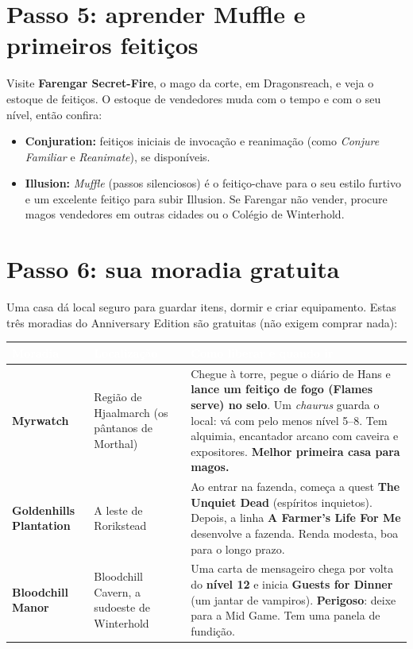 \documentclass[11pt,a4paper,oneside,openany]{book}
\newcommand{\magia}[1]{\textit{\textcolor{SoulCairnPurple}{#1}}}
\newcommand{\quest}[1]{\textsf{\textbf{\textcolor{NecroEmerald}{#1}}}}
\newcommand{\npc}[1]{\textbf{#1}}
\newcommand{\cabec}[1]{\textcolor{white}{\sffamily\bfseries\small #1}}
\newcommand{\tabhead}{\rowcolor{NecroEmerald}}
\begin{document}
\section{Passo 5: aprender Muffle e primeiros feitiços}
Visite \npc{Farengar Secret-Fire}, o mago da corte, em Dragonsreach, e veja o estoque de feitiços. O estoque de vendedores muda com o tempo e com o seu nível, então confira:
\begin{itemize}
  \item \textbf{Conjuration:} feitiços iniciais de invocação e reanimação (como \magia{Conjure Familiar} e \magia{Reanimate}), se disponíveis.
  \item \textbf{Illusion:} \magia{Muffle} (passos silenciosos) é o feitiço-chave para o seu estilo furtivo e um excelente feitiço para subir Illusion. Se Farengar não vender, procure magos vendedores em outras cidades ou o Colégio de Winterhold.
\end{itemize}

\Needspace{10cm}
\section{Passo 6: sua moradia gratuita}
Uma casa dá local seguro para guardar itens, dormir e criar equipamento. Estas três moradias do Anniversary Edition são gratuitas (não exigem comprar nada):

\begin{center}
\small
{}
\begin{tabularx}{\linewidth}{@{}L{2.2cm}L{3.0cm}Y@{}}
\tabhead \cabec{Moradia} & \cabec{Localização} & \cabec{Como liberar e quando ir} \\
\toprule
\textbf{Myrwatch} & Região de Hjaalmarch (os pântanos de Morthal) & Chegue à torre, pegue o diário de Hans e \textbf{lance um feitiço de fogo (Flames serve) no selo}. Um \emph{chaurus} guarda o local: vá com pelo menos nível 5--8. Tem alquimia, encantador arcano com caveira e expositores. \textbf{Melhor primeira casa para magos.} \\
\textbf{Goldenhills Plantation} & A leste de Rorikstead & Ao entrar na fazenda, começa a quest \quest{The Unquiet Dead} (espíritos inquietos). Depois, a linha \quest{A Farmer's Life For Me} desenvolve a fazenda. Renda modesta, boa para o longo prazo. \\
\textbf{Bloodchill Manor} & Bloodchill Cavern, a sudoeste de Winterhold & Uma carta de mensageiro chega por volta do \textbf{nível 12} e inicia \quest{Guests for Dinner} (um jantar de vampiros). \textbf{Perigoso}: deixe para a Mid Game. Tem uma panela de fundição. \\
\bottomrule
\end{tabularx}
\end{center}
\end{document}
